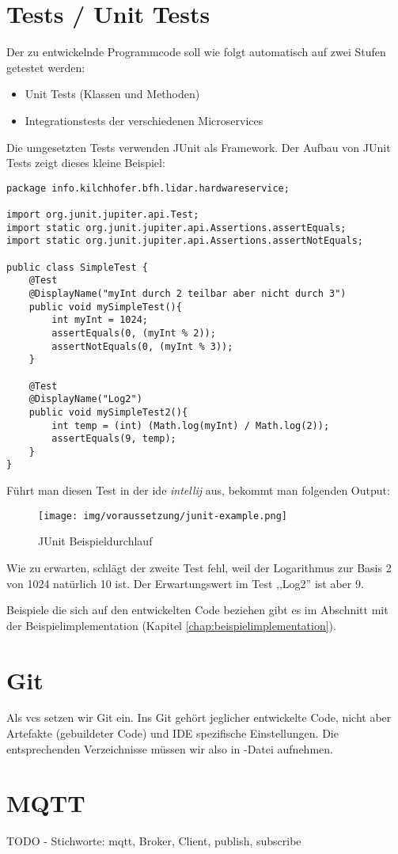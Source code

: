 \section{Tests / Unit Tests}
Der zu entwickelnde Programmcode soll wie folgt automatisch auf zwei Stufen getestet werden:
\begin{itemize}
	\item Unit Tests (Klassen und Methoden)
	\item Integrationstests der verschiedenen Microservices
\end{itemize}
Die umgesetzten Tests verwenden JUnit als Framework.  Der Aufbau von JUnit Tests zeigt dieses kleine Beispiel:
\begin{lstlisting}[caption={Simples Beispiel wie JUnit funktioniert},label={lst:junit-example-simple}]
package info.kilchhofer.bfh.lidar.hardwareservice;

import org.junit.jupiter.api.Test;
import static org.junit.jupiter.api.Assertions.assertEquals;
import static org.junit.jupiter.api.Assertions.assertNotEquals;

public class SimpleTest {
	@Test
	@DisplayName("myInt durch 2 teilbar aber nicht durch 3")
	public void mySimpleTest(){
		int myInt = 1024;
		assertEquals(0, (myInt % 2));
		assertNotEquals(0, (myInt % 3));
	}
	
	@Test
	@DisplayName("Log2")
	public void mySimpleTest2(){
		int temp = (int) (Math.log(myInt) / Math.log(2));
		assertEquals(9, temp);
	}
}
\end{lstlisting}
Führt man diesen Test in der \acrshort{ide} \textit{\Gls{intellij}} aus, bekommt man folgenden Output:
\begin{figure}[H]
	\centering
	\texttt{[image: img/voraussetzung/junit-example.png]}
	\caption{JUnit Beispieldurchlauf}
	\label{fig:junit-example}
\end{figure}
Wie zu erwarten, schlägt der zweite Test fehl, weil der Logarithmus zur Basis 2 von 1024 natürlich 10 ist. Der Erwartungswert im Test ,,Log2'' ist aber 9.

Beispiele die sich auf den entwickelten Code beziehen gibt es im Abschnitt mit der Beispielimplementation (Kapitel \ref{chap:beispielimplementation}).

\section{Git}
Als \acrshort{vcs} setzen wir Git ein. Ins Git gehört jeglicher entwickelte Code, nicht aber Artefakte (gebuildeter Code) und IDE spezifische Einstellungen. Die entsprechenden Verzeichnisse müssen wir also in -Datei aufnehmen.

\section{MQTT}
\label{sec:mqtt}
TODO - Stichworte: \acrshort{mqtt}, Broker, Client, publish, subscribe
